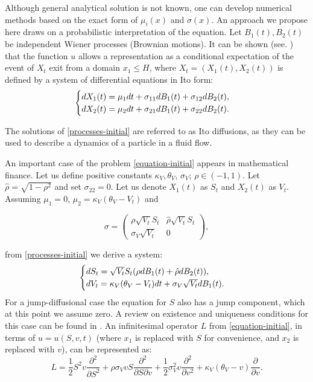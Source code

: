 \documentclass[a4paper]{jpconf}
\begin{document}
{Although general analytical solution is not known, one can develop numerical methods based on the exact form of $\mu_i(x)$ and $\sigma(x)$. 
An approach we propose here draws on a probabilistic interpretation of the equation. Let $B_1(t), B_2(t)$ be independent Wiener processes (Brownian motions). It can be shown (see. \cite{oksendal}) that the function $u$ allows a representation as a conditional expectation of the event of $X_t$ exit from a domain $x_1\le H$, where $X_t = (X_1(t), X_2(t))$ is defined by a system of differential equations in Ito form:
\begin{equation}\label{processes-initial}
\begin{array}l
\begin{cases}
dX_1(t) = \mu_1 dt + \sigma_{11} dB_1(t) + \sigma_{12} dB_2(t), \\
dX_2(t) = \mu_2 dt + \sigma_{21} dB_1(t) + \sigma_{22} dB_2(t).
\end{cases}
\end{array}
\end{equation}

The solutions of \eqref{processes-initial} are referred to as Ito diffusions, as they can be used to describe a dynamics of a particle in a fluid flow. 

An important case of the problem \eqref{equation-initial} appears in mathematical finance. Let us define positive constants $\kappa_V, \theta_V$, $\sigma_V$; $\rho \in (-1,1)$. Let $\hat{\rho} = \sqrt{1 - \rho^2}$ and set $\sigma_{22} = 0$. Let us denote $X_1(t)$ as $S_t$ and $X_2(t)$ as $V_t$. Assuming $\mu_1 = 0$, $\mu_2 = \kappa_V(\theta_V - V_t)$ and

$$\sigma =
\begin{pmatrix}
\rho \sqrt{V_t} S_t & \hat{\rho} \sqrt{V_t} S_t \\
\sigma_V\sqrt{V_t} & 0
\end{pmatrix},$$

from \eqref{processes-initial} we derive a system: 
\begin{equation}\label{processes-initial2}
\begin{array}l
\begin{cases}
dS_t = \sqrt{V_t} S_t (\rho dB_1(t) + \hat{\rho} dB_2(t)),\\
dV_t = \kappa_V(\theta_V - V_t) dt + \sigma_V \sqrt{V_t}dB_1(t).
\end{cases}
\end{array}
\end{equation}
For a jump-diffusional case the equation for $S$ also has a jump component, which at this point we assume zero. A review on existence and uniqueness conditions for this case can be found in \cite{cont_tankov}. An infinitesimal operator $L$ from \eqref{equation-initial}, in terms of $u=u(S,v,t)$ (where $x_1$ is replaced with $S$ for convenience, and $x_2$ is replaced with $v$), can be represented as:
\begin{equation}\label{generator-L}
L = \frac{1}{2}S^2 v \frac{\partial ^ 2}{\partial S ^ 2} + 
\rho \sigma_V v S \frac{\partial ^ 2}{\partial S \partial v} + 
\frac{1}{2}\sigma^2_V v\frac{\partial ^ 2}{\partial v ^ 2} + 
\kappa_V(\theta_V - v) \frac{\partial}{\partial v}.
\end{equation}

}
\end{document}
